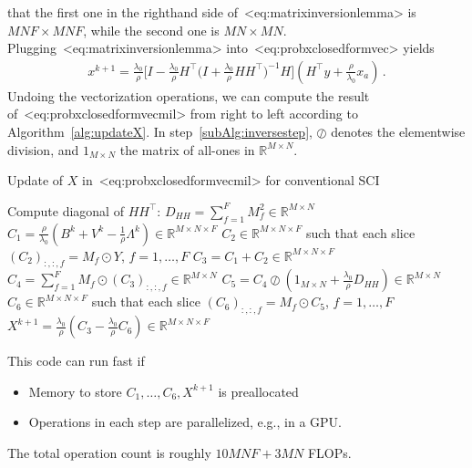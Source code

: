 \documentclass[a4paper,11pt]{article}
\def\eqref#1{<#1>}%
\begin{document}
that the first one in the righthand side of~\eqref{eq:matrixinversionlemma} is
$MNF \times MNF$, while the second one is $MN \times MN$.
Plugging~\eqref{eq:matrixinversionlemma} into~\eqref{eq:probxclosedformvec}
yields
\begin{align}
  x^{k+1}
  =
  \frac{\lambda_0}{\rho}
  \bigg[
    I - \frac{\lambda_0}{\rho}
    H^\top\big( I + \frac{\lambda_0}{\rho}H H^\top\big)^{-1}H
  \bigg]
  \left(H^\top y + \frac{\rho}{\lambda_0} x_a\right)\,.
  \label{eq:probxclosedformvecmil}
\end{align}
Undoing the vectorization operations, we can compute the result
of~\eqref{eq:probxclosedformvecmil} from right to left according to
Algorithm~\ref{alg:updateX}. In step~\ref{subAlg:inversestep}, $\oslash$ denotes
the elementwise division, and $1_{M\times N}$ the matrix of all-ones in
$\mathbb{R}^{M\times N}$.

\begin{algorithm}
  \caption{Update of $X$ in~\eqref{eq:probxclosedformvecmil} for
  conventional SCI}
  \label{alg:updateX}
  \begin{algorithmic}[1]
    \algrenewcommand{}
    \Require Compute diagonal of $HH^\top$: $D_{HH} = \sum_{f=1}^{F} M_f^2 \in \mathbb{R}^{M\times N}$
    \algrenewcommand{}
    \Require
    \State $C_1 = \frac{\rho}{\lambda_0} (B^k + V^k - \frac{1}{\rho}\Lambda^k) \in \mathbb{R}^{M\times N\times F}$
    \State $C_2 \in \mathbb{R}^{M\times N\times F}$ such that each slice
    $(C_2)_{:, :, f} = M_f \odot Y$, $f = 1, \ldots, F$
    \State $C_3 = C_1 + C_2 \in \mathbb{R}^{M \times N\times F}$
    \State $C_4 = \sum_{f=1}^{F} M_f \odot (C_3)_{:, :, f} \in \mathbb{R}^{M\times N}$
    \State $C_5 = C_4 \oslash (1_{M\times N} + \frac{\lambda_0}{\rho}D_{HH}) \in \mathbb{R}^{M\times N}$
    \label{subAlg:inversestep}
    \State $C_6 \in \mathbb{R}^{M\times N\times F}$ such that each slice
    $(C_6)_{:, :, f} = M_f \odot C_5$, $f = 1, \ldots, F$
    \State $X^{k+1} = \frac{\lambda_0}{\rho}(C_3 - \frac{\lambda_0}{\rho}C_6) \in \mathbb{R}^{M\times
    N\times F}$
  \end{algorithmic}
\end{algorithm}
This code can run fast if
\begin{itemize}
  \item Memory to store $C_1, \ldots, C_6, X^{k+1}$ is preallocated

  \item Operations in each step are parallelized, e.g., in a GPU.
\end{itemize}
The total operation count is roughly $10MNF + 3MN$ FLOPs.
\end{document}

